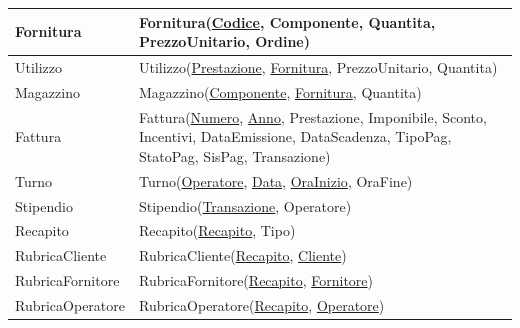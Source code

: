 \begin{longtable}{| p{3cm} | p{11.5cm} |}
				\hline
			Fornitura & 
				Fornitura(\underline{Codice}, Componente, Quantita, PrezzoUnitario, Ordine) \\
				\hline
			Utilizzo &
				Utilizzo(\underline{Prestazione}, \underline{Fornitura}, PrezzoUnitario, Quantita) \\
				\hline
			Magazzino &
				Magazzino(\underline{Componente}, \underline{Fornitura}, Quantita) \\
				\hline
			Fattura &
				Fattura(\underline{Numero}, \underline{Anno}, Prestazione, Imponibile, Sconto, Incentivi, DataEmissione, DataScadenza, TipoPag, StatoPag, SisPag, Transazione) \\
				\hline
			Turno & 
				Turno(\underline{Operatore}, \underline{Data}, \underline{OraInizio}, OraFine) \\
				\hline
			Stipendio &
				Stipendio(\underline{Transazione}, Operatore) \\
				\hline
			Recapito &
				Recapito(\underline{Recapito}, Tipo) \\
				\hline
			RubricaCliente &
				RubricaCliente(\underline{Recapito}, \underline{Cliente}) \\
				\hline
			RubricaFornitore &
				RubricaFornitore(\underline{Recapito}, \underline{Fornitore}) \\
				\hline
			RubricaOperatore &
				RubricaOperatore(\underline{Recapito}, \underline{Operatore}) \\
				\hline

		\end{longtable}
	\vspace{2ex}

